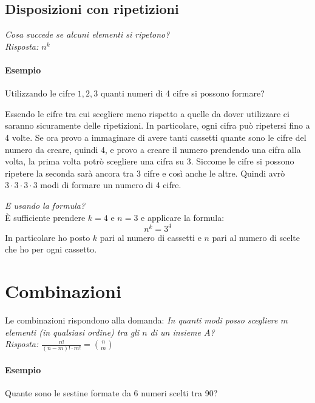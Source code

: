 \documentclass[12pt, a4paper]{report}
\theoremstyle{definition}
\begin{document}
\subsection{Disposizioni con ripetizioni}
\textit{Cosa succede se alcuni elementi si ripetono?}
\\\textit{Risposta: $n^k$}

\paragraph*{Esempio}
Utilizzando le cifre $1,2,3$ quanti numeri di 4 cifre si possono formare?

Essendo le cifre tra cui scegliere meno rispetto a quelle da dover utilizzare ci
saranno sicuramente delle ripetizioni. In particolare, ogni cifra può ripetersi
fino a 4 volte. Se ora provo a immaginare di avere tanti cassetti quante sono le
cifre del numero da creare, quindi 4, e provo a creare il numero prendendo una
cifra alla volta, la prima volta potrò scegliere una cifra su 3. Siccome le cifre
si possono ripetere la seconda sarà ancora tra 3 cifre e così anche le altre.
Quindi avrò $3\cdot 3\cdot 3\cdot 3$ modi di formare un numero di 4 cifre.

\textit{E usando la formula?}
\\È sufficiente prendere $k=4$ e $n=3$ e applicare la formula:
\[n^k = 3^4\]
In particolare ho posto $k$ pari al numero di cassetti e $n$ pari al numero di
scelte che ho per ogni cassetto.

\section{Combinazioni}
Le combinazioni rispondono alla domanda: \textit{In quanti modi posso scegliere
$m$ elementi (in qualsiasi ordine) tra gli $n$ di un insieme $A$?}
\\\textit{Risposta: $\frac{n!}{(n-m)!\cdot m!} = \binom{n}{m} $}

\paragraph*{Esempio}
Quante sono le sestine formate da 6 numeri scelti tra 90?
\end{document}
